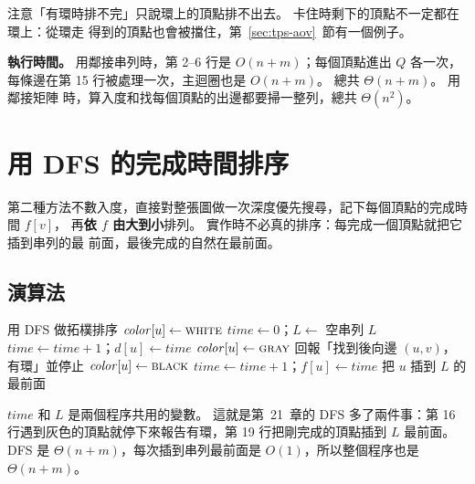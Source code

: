 注意「有環時排不完」只說環上的頂點排不出去。 卡住時剩下的頂點不一定都在環上：從環走
得到的頂點也會被擋住，第~\ref{sec:tps-aov}~節有一個例子。

\textbf{執行時間。} 用鄰接串列時，第 2--6 行是 $O(n + m)$；每個頂點進出 $Q$ 各一次，
每條邊在第 15 行被處理一次，主迴圈也是 $O(n + m)$。 總共 $\Theta(n + m)$。 用鄰接矩陣
時，算入度和找每個頂點的出邊都要掃一整列，總共 $\Theta(n^2)$。

\section{用 DFS 的完成時間排序}
\label{sec:tps-dfs}

第二種方法不數入度，直接對整張圖做一次深度優先搜尋，記下每個頂點的完成時間 $f[v]$，
再\textbf{依 $f$ 由大到小}排列。 實作時不必真的排序：每完成一個頂點就把它插到串列的最
前面，最後完成的自然在最前面。

\tpsneed{8cm}
\subsection{演算法}

\begin{pseudo}[label=alg:tps-dfs]{用 DFS 做拓樸排序}
        \State $\mathit{color}[u] \gets \textsc{white}$
    \EndFor
    \State $\mathit{time} \gets 0$；$L \gets$ 空串列
            \State {}
        \EndIf
    \EndFor
    \State \Return $L$
\EndFunction
{}
    \State $\mathit{time} \gets \mathit{time} + 1$；$d[u] \gets \mathit{time}$
    \State $\mathit{color}[u] \gets \textsc{gray}$
     
            \State {}
            \State 回報「找到後向邊 $(u, v)$，有環」並停止
        \EndIf
    \EndFor
    \State $\mathit{color}[u] \gets \textsc{black}$
    \State $\mathit{time} \gets \mathit{time} + 1$；$f[u] \gets \mathit{time}$
    \State 把 $u$ 插到 $L$ 的最前面
\EndProcedure
\end{pseudo}

$\mathit{time}$ 和 $L$ 是兩個程序共用的變數。 這就是第~21~章的 DFS 多了兩件事：第 16
行遇到灰色的頂點就停下來報告有環，第 19 行把剛完成的頂點插到 $L$ 最前面。 DFS 是
$\Theta(n + m)$，每次插到串列最前面是 $O(1)$，所以整個程序也是 $\Theta(n + m)$。

